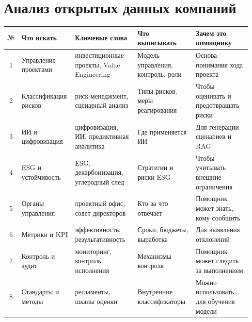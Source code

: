 \documentclass[12pt]{article}
\begin{document}
\section{Анализ открытых данных компаний}
\begin{longtable}{|c|p{3.5cm}|p{3.5cm}|p{3.5cm}|p{4.5cm}|}
    \hline
    \textbf{№} & \textbf{Что искать} & \textbf{Ключевые слова} & \textbf{Что выписывать} & \textbf{Зачем это помощнику} \\
    \hline
    1 & Управление проектами & инвестиционные проекты, Value Engineering & Модель управления, контроль, роли & Основа понимания хода проекта \\
    \hline
    2 & Классификация рисков & риск-менеджмент, сценарный анализ & Типы рисков, меры реагирования & Чтобы оценивать и предотвращать риски \\
    \hline
    3 & ИИ и цифровизация & цифровизация, ИИ, предиктивная аналитика & Где применяется ИИ & Для генерации сценариев и RAG \\
    \hline
    4 & ESG и устойчивость & ESG, декарбонизация, углеродный след & Стратегии и риски ESG & Чтобы учитывать внешние ограничения \\
    \hline
    5 & Органы управления & проектный офис, совет директоров & Кто за что отвечает & Помощник может знать, кому сообщить \\
    \hline
    6 & Метрики и KPI & эффективность, результативность & Сроки, бюджеты, выработка & Для выявления отклонений \\
    \hline
    7 & Контроль и аудит & мониторинг, контроль исполнения & Механизмы контроля & Помощник может следить за выполнением \\
    \hline
    8 & Стандарты и методы & регламенты, шкалы оценки & Внутренние классификаторы & Можно использовать для обучения модели \\
    \hline
    \end{longtable}
\end{document}

